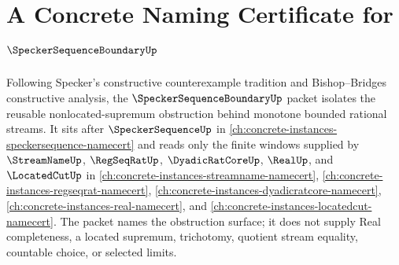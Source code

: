 \chapter{A Concrete Naming Certificate for $\SpeckerSequenceBoundaryUp$}
\label{ch:concrete-instances-specker-sequence-boundary-namecert}

Following Specker's constructive counterexample tradition and Bishop--Bridges constructive analysis, the $\SpeckerSequenceBoundaryUp$ packet isolates the reusable nonlocated-supremum obstruction behind monotone bounded rational streams. It sits after $\SpeckerSequenceUp$ in \autoref{ch:concrete-instances-speckersequence-namecert} and reads only the finite windows supplied by $\StreamNameUp$, $\RegSeqRatUp$, $\DyadicRatCoreUp$, $\RealUp$, and $\LocatedCutUp$ in \autoref{ch:concrete-instances-streamname-namecert}, \autoref{ch:concrete-instances-regseqrat-namecert}, \autoref{ch:concrete-instances-dyadicratcore-namecert}, \autoref{ch:concrete-instances-real-namecert}, and \autoref{ch:concrete-instances-locatedcut-namecert}. The packet names the obstruction surface; it does not supply Real completeness, a located supremum, trichotomy, quotient stream equality, countable choice, or selected limits.

